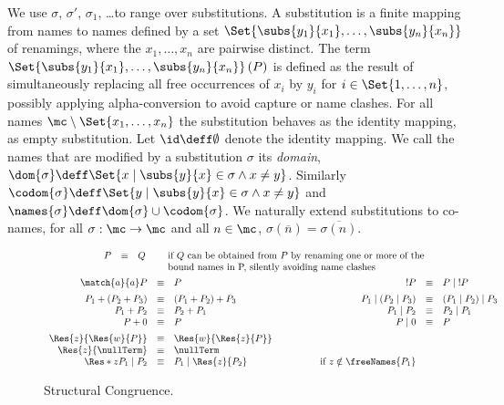 \documentclass[]{article}
\begin{document}
We use $ \sigma $, $ \sigma' $, $ \sigma_1 $, \ldots to range over substitutions. A substitution is a finite mapping from names to names defined by a set $ \Set{ \subs{y_1}{x_1}, \ldots, \subs{y_n}{x_n} } $ of renamings, where the $ x_1, \ldots, x_n $ are pairwise distinct.
The term $ \Set{ \subs{y_1}{x_1}, \ldots, \subs{y_n}{x_n} }\left( P \right) $ is defined as the result of simultaneously replacing all free occurrences of $ x_i $ by $ y_i $ for $ i \in \Set{ 1, \ldots, n } $, possibly applying alpha-conversion to avoid capture or name clashes. For all names $ \mc \setminus \Set{ x_1, \ldots, x_n } $ the substitution behaves as the identity mapping, \ie as empty substitution.
Let $ \id \deff \emptyset $ denote the identity mapping.
We call the names that are modified by a substitution $ \sigma $ its \emph{domain}, \ie $ \dom{\sigma} \deff \Set{ x \mid \subs{y}{x} \in \sigma \wedge x \neq y } $. Similarly $ \codom{\sigma} \deff \Set{ y \mid \subs{y}{x} \in \sigma \wedge x \neq y } $ and $ \names{\sigma} \deff \dom{\sigma} \cup \codom{\sigma} $.
We naturally extend substitutions to co-names, \ie for all $ \sigma : \mc \to \mc $ and all $ n \in \mc $, $ \sigma\!\left( \overline{n} \right) = \overline{\sigma\!\left( n \right)} $.

\begin{figure}[t]
	\begin{align*}
		& \hspace{5.7em} \begin{array}{r@{\quad}c@{\quad}ll}
			P & \equiv & Q & \quad
				\begin{aligned}[t]
					& \text{ if } Q \text{ can be obtained from } P \text{ by renaming one or more of the}\\
					& \text{ bound names in P, silently avoiding name clashes }
				\end{aligned}
		\end{array}\\
		& \begin{array}{r@{\quad}c@{\quad}lcr@{\quad}c@{\quad}l}
			\match{a}{a}P & \equiv & P & \hspace{3em} & !P & \equiv & P \mid \; !P \vspace{0.5em}\\
			P_1 + \left( P_2 + P_3 \right) & \equiv & \left( P_1 + P_2 \right) + P_3 & & P_1 \mid \left( P_2 \mid P_3 \right) & \equiv & \left( P_1 \mid P_2 \right) \mid P_3\\
			P_1 + P_2 & \equiv & P_2 + P_1 & & P_1 \mid P_2 & \equiv & P_2 \mid P_1\\
			P + 0 & \equiv & P & & P \mid 0 & \equiv & P \vspace{0.5em}\\
			\Res{z}{\Res{w}{P}} & \equiv & \Res{w}{\Res{z}{P}}\\
			\Res{z}{\nullTerm} & \equiv & \nullTerm\\
			\Res*{z}{P_1 \mid P_2} & \equiv & P_1 \mid \Res{z}{P_2} & & \text{if } z \notin \freeNames{P_1}
		\end{array}
	\end{align*}
	\caption{Structural Congruence.}
	\label{fig:structuralCongruence}
\end{figure}
\end{document}
